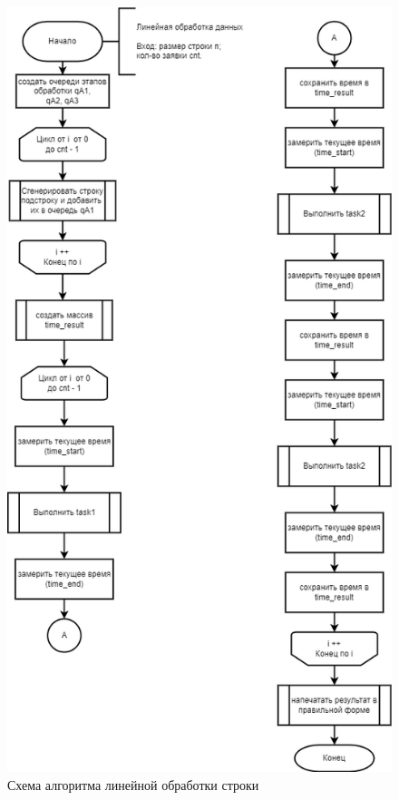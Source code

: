 \begin{figure}[h]
	\centering
	\includegraphics[scale=0.55]{img/linear_processing.png}
	\caption{Схема алгоритма линейной обработки строки}
	\label{fig:linear_processing}
\end{figure}

